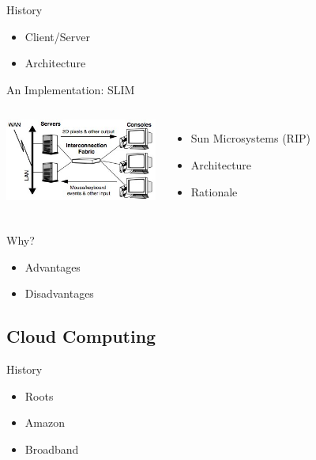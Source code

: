 \documentclass{beamer}
\begin{document}
\begin{frame}{History}
  \begin{itemize}
  \item Client/Server
  \item Architecture
  \end{itemize}
\end{frame}

\begin{frame}{An Implementation: SLIM}
  \begin{columns}
    \column{5cm}
      \includegraphics[width=5cm]{slimArchitecture.jpg}
    \column{5cm}
      \begin{itemize}
      \item Sun Microsystems (RIP)
      \item Architecture
      \item Rationale
      \end{itemize}
  \end{columns}
\end{frame}

\begin{frame}{Why?}
  \begin{itemize}
  \item Advantages
  \item Disadvantages
  \end{itemize}
\end{frame}


\subsection{Cloud Computing}

\begin{frame}{History}
  \begin{itemize}
  \item Roots
  \item Amazon
  \item Broadband
  \end{itemize}
\end{frame}
\end{document}
